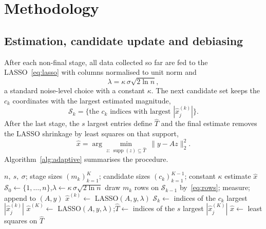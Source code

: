 \documentclass[11pt,a4paper]{article}
\theoremstyle{definition}
\DeclareMathOperator{\supp}{supp}
\newcommand{\norm}[1]{\lVert #1\rVert}
\begin{document}
\section{Methodology}\label{sec:method}

\subsection{Estimation, candidate update and debiasing}
After each non-final stage, all data collected so far are fed to the LASSO~\eqref{eq:lasso} with columns normalised to unit norm and
\begin{equation}\label{eq:lambda}
  \lambda=\kappa\,\sigma\sqrt{2\ln n},
\end{equation}
a standard noise-level choice with a constant $\kappa$. The next candidate set keeps the $c_k$ coordinates with the largest estimated magnitude,
\begin{equation}\label{eq:candidate}
  \mathcal S_k=\{\text{the } c_k \text{ indices with largest } |\hat x^{(k)}_j|\}.
\end{equation}
After the last stage, the $s$ largest entries define $\hat T$ and the final estimate removes the LASSO shrinkage by least squares on that support,
\begin{equation}\label{eq:debias}
  \hat x=\arg\min_{z:\ \supp(z)\subseteq\hat T}\ \norm{y-Az}_2^2 .
\end{equation}
Algorithm~\ref{alg:adaptive} summarises the procedure.

\begin{algorithm}[tbp]
\caption{Multi-stage adaptive sampling with LASSO refinement}\label{alg:adaptive}
\begin{algorithmic}[1]
\Require $n,\ s,\ \sigma$; stage sizes $(m_k)_{k=1}^K$; candidate sizes $(c_k)_{k=1}^{K-1}$; constant $\kappa$
\Ensure estimate $\hat x$
\State $\mathcal S_0\gets\{1,\dots,n\}$,\quad $\lambda\gets\kappa\,\sigma\sqrt{2\ln n}$ 
  \State draw $m_k$ rows on $\mathcal S_{k-1}$ by~\eqref{eq:rows}; measure; append to $(A,y)$
    \State $\hat x^{(k)}\gets$ LASSO$(A,y,\lambda)$ 
    \State $\mathcal S_k\gets$ indices of the $c_k$ largest $|\hat x^{(k)}_j|$ 
  \EndIf
\EndFor
\State $\hat x^{(K)}\gets$ LASSO$(A,y,\lambda)$;\quad $\hat T\gets$ indices of the $s$ largest $|\hat x^{(K)}_j|$
\State \Return $\hat x\gets$ least squares on $\hat T$ 
\end{algorithmic}
\end{algorithm}
\end{document}
